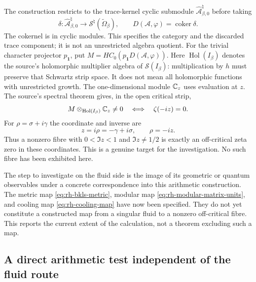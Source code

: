 The construction restricts to the trace-kernel cyclic submodule
$\widehat{\mathcal A}_{\beta,0}^{\natural}$ before taking
\[
 \delta:\widehat{\mathcal A}_{\beta,0}^{\natural}
 \longrightarrow\mathcal S^{\natural}(\widetilde\Omega_\beta),
 \qquad D(\mathcal A,\varphi)=\operatorname{coker}\delta.
\]
The cokernel is in cyclic modules. This specifies the category and the
discarded trace component; it is not an unrestricted algebra quotient.
For the trivial character projector $p_{\mathbf1}$, put
$M=HC_0(p_{\mathbf1}D(\mathcal A,\varphi))$. Here
$\operatorname{Hol}(I_\beta)$ denotes the source's holomorphic multiplier
algebra of $\mathcal S(I_\beta)$: multiplication by $h$ must preserve that
Schwartz strip space. It does not mean all holomorphic functions with
unrestricted growth. The one-dimensional module $\mathbb C_z$ uses evaluation at
$z$. The source's spectral theorem
\cite[Theorem 4.16, (4.36)]{ccmEndomotives} gives, in the open critical strip,
\begin{equation}
 M\otimes_{\operatorname{Hol}(I_\beta)}\mathbb C_z\ne0
 \quad\Longleftrightarrow\quad \zeta(-iz)=0.
 \label{eq:rh-ccm-spectral-support}
\end{equation}
For $\rho=\sigma+i\gamma$ the coordinate and inverse are
\begin{equation}
 z=i\rho=-\gamma+i\sigma,\qquad \rho=-iz.
 \label{eq:rh-ccm-zero-coordinate}
\end{equation}
Thus a nonzero fibre with $0<\Im z<1$ and $\Im z\ne1/2$ is exactly an
off-critical zeta zero in these coordinates. This is a genuine target for
the investigation. No such fibre has been exhibited here.

The step to investigate on the fluid side is the image of its geometric or
quantum observables under a concrete correspondence into this arithmetic
construction. The metric map \eqref{eq:rh-bkls-metric}, modular map
\eqref{eq:rh-modular-matrix-units}, and cooling map
\eqref{eq:rh-cooling-map} have now been specified. They do not yet constitute
a constructed map from a singular fluid to a nonzero off-critical fibre.
This reports the current extent of the calculation, not a theorem excluding
such a map.

\subsection{A direct arithmetic test independent of the fluid route}

